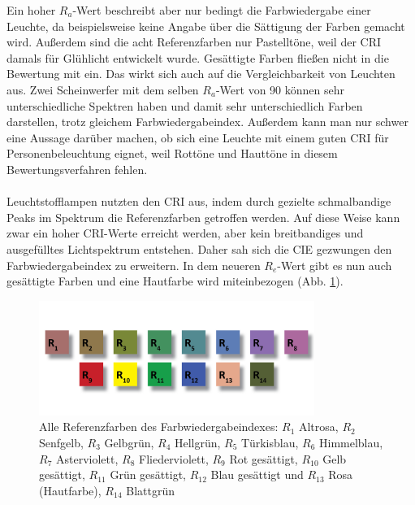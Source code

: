 Ein hoher $R_{a}$-Wert beschreibt aber nur bedingt die Farbwiedergabe einer Leuchte, da beispielsweise keine Angabe über die Sättigung der Farben gemacht wird. Außerdem sind die acht Referenzfarben nur Pastelltöne, weil der CRI damals für Glühlicht entwickelt wurde. Gesättigte Farben fließen nicht in die Bewertung mit ein.
Das wirkt sich auch auf die Vergleichbarkeit von Leuchten aus. Zwei Scheinwerfer mit dem selben $R_{a}$-Wert von 90 können sehr unterschiedliche Spektren haben und damit sehr unterschiedlich Farben darstellen, trotz gleichem Farbwiedergabeindex.
Außerdem kann man nur schwer eine Aussage darüber machen, ob sich eine Leuchte mit einem guten CRI für Personenbeleuchtung eignet, weil Rottöne und Hauttöne in diesem Bewertungsverfahren fehlen.\\\\
Leuchtstofflampen nutzten den CRI aus, indem durch gezielte schmalbandige Peaks im Spektrum die Referenzfarben getroffen werden. Auf diese Weise kann zwar ein hoher CRI-Werte erreicht werden, aber kein breitbandiges und ausgefülltes Lichtspektrum entstehen. Daher sah sich die CIE gezwungen den Farbwiedergabeindex zu erweitern. In dem neueren $R_{e}$-Wert gibt es nun auch gesättigte Farben und eine Hautfarbe wird miteinbezogen (Abb. \ref{b_cri}).

\begin{figure}[htp]     %
\centering
\includegraphics[width=0.8\textwidth]{bilder/cri} 
\caption {Alle Referenzfarben des Farbwiedergabeindexes: $R_{1}$ Altrosa, $R_{2}$ Senfgelb, $R_{3}$ Gelbgrün, $R_{4}$ Hellgrün, $R_{5}$ Türkisblau, $R_{6}$ Himmelblau, $R_{7}$ Asterviolett, $R_{8}$ Fliederviolett, $R_{9}$ Rot gesättigt, $R_{10}$ Gelb gesättigt, $R_{11}$ Grün gesättigt, $R_{12}$ Blau gesättigt und $R_{13}$ Rosa (Hautfarbe), $R_{14}$ Blattgrün \protect\footnotemark}\label{b_cri}
\end{figure}


